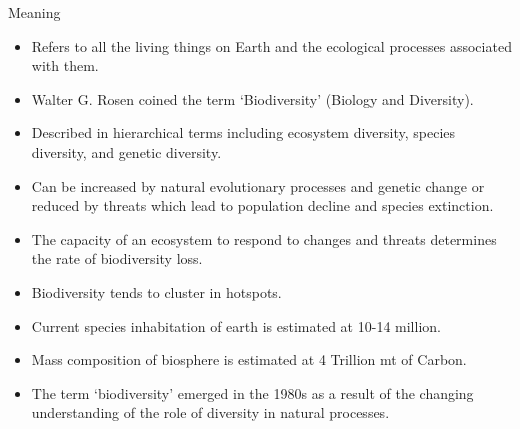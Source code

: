 \documentclass[
  ignorenonframetext,
  aspectratio=169]{beamer}
\providecommand{\tightlist}{%
  \setlength{\itemsep}{0pt}\setlength{\parskip}{0pt}}
\begin{document}
\begin{frame}{Meaning}
\protect\hypertarget{meaning}{}
\begin{itemize}
\tightlist
\item
  Refers to all the living things on Earth and the ecological processes
  associated with them.
\item
  Walter G. Rosen coined the term `Biodiversity' (\alert{Biology} and
  \alert{Diversity}).
\item
  Described in hierarchical terms including ecosystem diversity, species
  diversity, and genetic diversity.
\item
  Can be increased by natural evolutionary processes and genetic change
  or reduced by threats which lead to population decline and species
  extinction.
\item
  The capacity of an ecosystem to respond to changes and threats
  determines the rate of biodiversity loss.
\item
  Biodiversity tends to cluster in hotspots.
\item
  Current species inhabitation of earth is estimated at 10-14 million.
\item
  Mass composition of biosphere is estimated at 4 Trillion mt of Carbon.
\item
  The term `biodiversity' emerged in the 1980s as a result of the
  changing understanding of the role of diversity in natural processes.
\end{itemize}
\end{frame}
\end{document}
